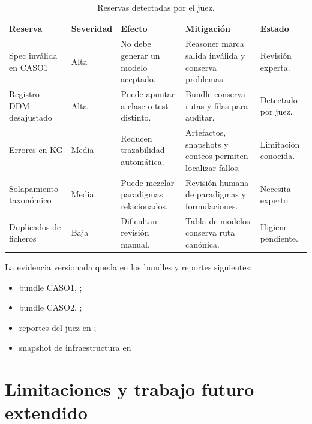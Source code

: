 \begin{table}[H]
\begin{center}
\scriptsize
\begin{tabular}{|p{2.3cm}|p{1.5cm}|p{3cm}|p{3cm}|p{2.2cm}|} \hline
\textbf{Reserva} & \textbf{Severidad} & \textbf{Efecto} & \textbf{Mitigación} & \textbf{Estado} \\ \hline
Spec inválida en CASO1 & Alta & No debe generar un modelo aceptado. & Reasoner marca salida inválida y conserva problemas. & Revisión experta. \\ \hline
Registro DDM desajustado & Alta & Puede apuntar a clase o test distinto. & Bundle conserva rutas y filas para auditar. & Detectado por juez. \\ \hline
Errores en KG & Media & Reducen trazabilidad automática. & Artefactos, snapshots y conteos permiten localizar fallos. & Limitación conocida. \\ \hline
Solapamiento taxonómico & Media & Puede mezclar paradigmas relacionados. & Revisión humana de paradigmas y formulaciones. & Necesita experto. \\ \hline
Duplicados de ficheros & Baja & Dificultan revisión manual. & Tabla de modelos conserva ruta canónica. & Higiene pendiente. \\ \hline
\end{tabular}
\caption{Reservas detectadas por el juez.}
\end{center}
\end{table}

La evidencia versionada queda en los bundles y reportes siguientes:

\begin{small}
\begin{itemize}
\item bundle CASO1, ;
\item bundle CASO2, ;
\item reportes del juez en ;
\item snapshot de infraestructura en 
\end{itemize}
\end{small}

\section{Limitaciones y trabajo futuro extendido}
\label{ap:limitaciones-extendidas}

